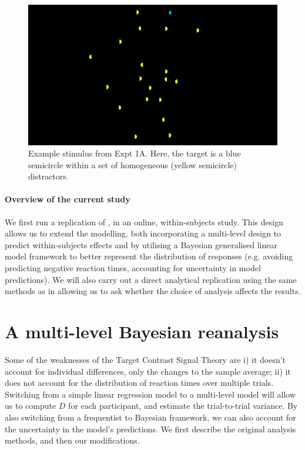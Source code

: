 \documentclass[smallextended]{svjour3}       %
\begin{document}
\begin{figure}
\centering
\includegraphics[width=\textwidth]{../plots/screenshot26.png}
\caption{Example stimulus from \cite{buetti2019predicting} Expt 1A. Here, the target is a blue semicircle within a set of homogeneous (yellow semicircle) distractors.}
\label{fig:buetti2019_stimulus}
\end{figure}

\paragraph{Overview of the current study}
We first run a replication of \cite{buetti2019predicting}, in an online, within-subjects study. This design allows us to extend the modelling, both incorporating a multi-level design to predict within-subjects effects and by utilising a Bayesian generalised linear model framework to better represent the distribution of responses (e.g. avoiding predicting negative reaction times, accounting for uncertainty in model predictions). We will also carry out a direct analytical replication using the same methods as in \cite{buetti2019predicting} allowing us to ask whether the choice of analysis affects the results.

\section{A multi-level Bayesian reanalysis}
\label{sec:reanalysis}

Some of the weaknesses of the Target Contrast Signal Theory are i) it doesn't account for individual differences, only the changes to the sample average;  ii) it does not account for the distribution of reaction times over multiple trials. Switching from a simple linear regression model to a multi-level model will allow us to compute $D$ for each participant, and estimate the trial-to-trial variance. By also switching from a frequentist to Bayesian framework, we can also account for the uncertainty in the model's predictions. We first describe the original analysis methods, and then our modifications. 
\end{document}
